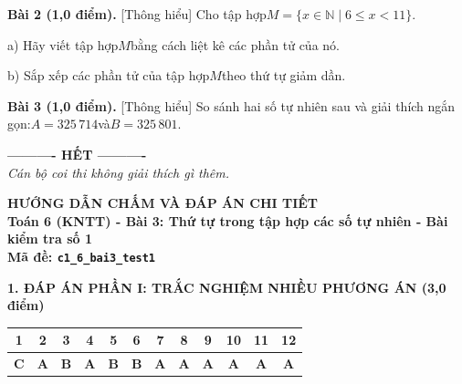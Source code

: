 \documentclass[11pt,a4paper]{article}
\begin{document}
\noindent\textbf{Bài 2 (1,0 điểm).} [Thông hiểu] Cho tập hợp$M = \{x \in \mathbb{N} \mid 6 \le x < 11\}$.\par\noindent a) Hãy viết tập hợp$M$bằng cách liệt kê các phần tử của nó.\par\noindent b) Sắp xếp các phần tử của tập hợp$M$theo thứ tự giảm dần.\par\vspace{8pt}

\noindent\textbf{Bài 3 (1,0 điểm).} [Thông hiểu] So sánh hai số tự nhiên sau và giải thích ngắn gọn:$A = 325\,714$và$B = 325\,801$.\par\vspace{8pt}


\begin{center}
\textbf{---------- HẾT ----------}\\
\textit{\small Cán bộ coi thi không giải thích gì thêm.}
\end{center}

\newpage
\begin{center}
{\Large\bfseries HƯỚNG DẪN CHẤM VÀ ĐÁP ÁN CHI TIẾT}\\[4pt]
{\large\bfseries Toán 6 (KNTT) - Bài 3: Thứ tự trong tập hợp các số tự nhiên - Bài kiểm tra số 1}\\[2pt]
{\bfseries Mã đề: \texttt{c1\_6\_bai3\_test1}}
\end{center}

\vspace{10pt}
\noindent\textbf{\large 1. ĐÁP ÁN PHẦN I: TRẮC NGHIỆM NHIỀU PHƯƠNG ÁN (3,0 điểm)}
\vspace{4pt}
\begin{center}
\begin{tabular}{|c|c|c|c|c|c|c|c|c|c|c|c|}
\hline
\textbf{1} & \textbf{2} & \textbf{3} & \textbf{4} & \textbf{5} & \textbf{6} & \textbf{7} & \textbf{8} & \textbf{9} & \textbf{10} & \textbf{11} & \textbf{12} \\
\hline
\textbf{C} & \textbf{A} & \textbf{B} & \textbf{A} & \textbf{B} & \textbf{B} & \textbf{A} & \textbf{A} & \textbf{A} & \textbf{A} & \textbf{A} & \textbf{A} \\
\hline
\end{tabular}
\end{center}
\vspace{6pt}
\end{document}
